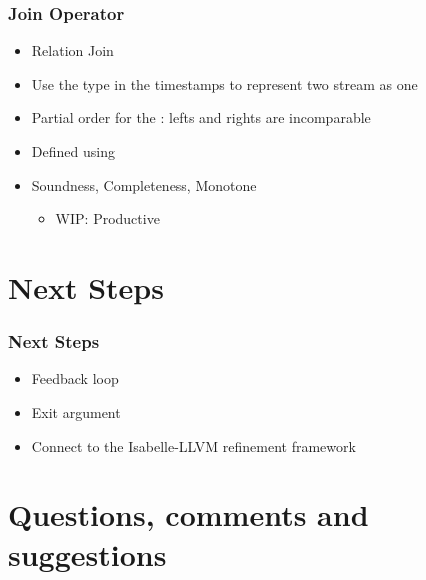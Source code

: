 \documentclass[aspectratio=169,10pt]{beamer}
\begin{document}
\begin{frame}[fragile]
  \frametitle{Join Operator}
  \begin{itemize}
    \item Relation Join
    \item Use the  type in the timestamps to represent two stream as one
    \item Partial order for the : lefts and rights are incomparable
    \item Defined using 
    \item Soundness, Completeness, Monotone
          \begin{itemize}
            \item WIP: Productive
          \end{itemize}
  \end{itemize}
\end{frame}

\section{Next Steps}

\begin{frame}
  \frametitle{Next Steps}
  \begin{itemize}
    \item Feedback loop
    \item Exit argument
    \item Connect to the Isabelle-LLVM refinement framework
  \end{itemize}
\end{frame}

\section{Questions, comments and suggestions}
\end{document}
